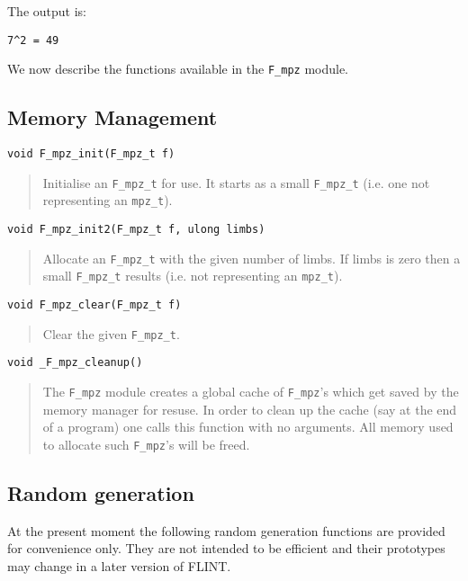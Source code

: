 \documentclass[a4paper,10pt]{article}
\newcommand{\code}{\lstinline}
\begin{document}
The output is:

\begin{lstlisting}
7^2 = 49
\end{lstlisting}

We now describe the functions available in the \code{F_mpz} module.

\subsection{Memory Management}

\begin{lstlisting}
void F_mpz_init(F_mpz_t f)
\end{lstlisting}
\begin{quote}
Initialise an \code{F_mpz_t} for use. It starts as a small \code{F_mpz_t} (i.e. one not representing an \code{mpz_t}).
\end{quote}

\begin{lstlisting}
void F_mpz_init2(F_mpz_t f, ulong limbs)
\end{lstlisting}
\begin{quote}
Allocate an \code{F_mpz_t} with the given number of limbs. If limbs is zero then a small \code{F_mpz_t} results (i.e. not representing an \code{mpz_t}).
\end{quote}

\begin{lstlisting}
void F_mpz_clear(F_mpz_t f)
\end{lstlisting}
\begin{quote}
Clear the given \code{F_mpz_t}.
\end{quote}

\begin{lstlisting}
void _F_mpz_cleanup()
\end{lstlisting}
\begin{quote}
The \code{F_mpz} module creates a global cache of \code{F_mpz}'s which get saved by the memory manager for resuse. In order to clean up the cache (say at the end of a program) one calls this function with no arguments. All memory used to allocate such \code{F_mpz}'s will be freed.
\end{quote}

\subsection{Random generation}

At the present moment the following random generation functions are provided for convenience only. They are not intended to be efficient and their prototypes may change in a later version of FLINT.
\end{document}

